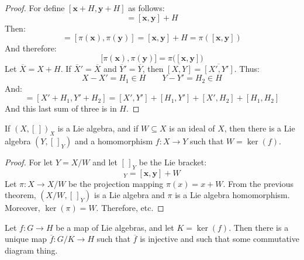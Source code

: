     \begin{proof}
        For define $[\mathbf{x}+H,\mathbf{y}+H]$ as follows:
        \begin{equation}
            [\mathbf{x}+H,\mathbf{y}+H]=[\mathbf{x},\mathbf{y}]+H
        \end{equation}
        Then:
        \begin{equation}
            [\mathbf{x}+H,\mathbf{y}+H]
            =[\pi(\mathbf{x}),\pi(\mathbf{y})]
            =[\mathbf{x},\mathbf{y}]+H
            =\pi([\mathbf{x},\mathbf{y}])
        \end{equation}
        And therefore:
        \begin{equation}
            \big[\pi(\mathbf{x}),\pi(\mathbf{y})\big]
            =\pi\big([\mathbf{x},\mathbf{y}]\big)
        \end{equation}
        Let $\overline{X}=X+H$. If $\overline{X}'=\overline{X}$ and
        $\overline{Y}'=\overline{Y}$, then
        $\overline{[X,Y]}=\overline{[X',Y']}$. Thus:
        \begin{equation}
            X-X'=H_{1}\in{H}\quad\quad
            Y-Y'=H_{2}\in{H}
        \end{equation}
        And:
        \begin{equation}
            [X,Y]=[X'+H_{1},Y'+H_{2}]
            =[X',Y']+[H_{1},Y']+[X',H_{2}]+[H_{1},H_{2}]
        \end{equation}
        And this last sum of three is in $H$.
    \end{proof}
    \begin{theorem}
        If $(X,[\,])_{X}$ is a Lie algebra, and if $W\subseteq{X}$ is an
        ideal of $X$, then there is a Lie algebra $(Y,[\,]_{Y})$ and a
        homomorphism $f:X\rightarrow{Y}$ such that $W=\ker(f)$.
    \end{theorem}
    \begin{proof}
        For let $Y=X/W$ and let $[\,]_{Y}$ be the Lie bracket:
        \begin{equation}
            [\mathbf{x}+W,\mathbf{y}+W]_{Y}=[\mathbf{x},\mathbf{y}]+W
        \end{equation}
        Let $\pi:X\rightarrow{X/W}$ be the projection mapping
        $\pi(x)=x+W$. From the previous theorem,
        $(X/W,[\,]_{Y})$ is a Lie algebra and $\pi$ is a Lie algebra
        homomorphism. Moreover, $\ker(\pi)=W$. Therefore, etc.
    \end{proof}
    \begin{theorem}
        Let $f:G\rightarrow{H}$ be a map of Lie algebras, and let
        $K=\ker(f)$. Then there is a unique map
        $\overline{f}:G/K\rightarrow{H}$ such that $\overline{f}$ is
        injective and such that some commutative diagram thing.
    \end{theorem}
